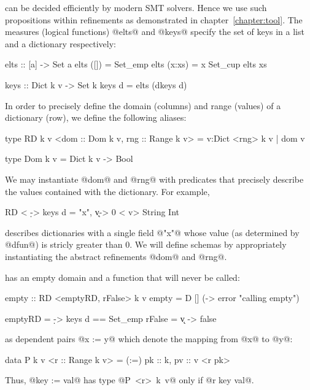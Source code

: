  can be decided
efficiently by modern SMT solvers. Hence we use such 
propositions within refinements as demonstrated in chapter~\ref{chapter:tool}.
% 
The measures (logical functions) @elts@ and @keys@ 
specify the set of keys in a list and a dictionary 
respectively:
%
\begin{code}
  elts        :: [a] -> Set a
  elts ([])   = Set_emp
  elts (x:xs) = {x} Set_cup elts xs

  keys        :: Dict k v -> Set k
  keys d      = elts (dkeys d) 
\end{code}

%
In order to precisely define the domain (\eg columns) and range (\eg values)
of a dictionary (\eg row), we define the following aliases:
%
\begin{code}
  type RD k v <dom :: Dom k v, rng :: Range k v>
    = {v:Dict <rng> k v | dom v}

  type Dom k v = Dict k v -> Bool 
\end{code}
%
We may instantiate @dom@ and @rng@ with predicates that precisely describe
the values contained with the dictionary.
%
For example,
%
\begin{code}
  RD < \d -> keys d = {"x"}, \k v-> 0 < v> String Int
\end{code}
%
%
describes dictionaries with a single field @"x"@ 
whose value (as determined by @dfun@) is stricly 
greater than 0.
%
We will define schemas by appropriately 
instantiating the abstract refinements 
@dom@ and @rng@.


 has an empty domain 
and a function that will never be called:
%
\begin{code}
  empty   :: RD <emptyRD, rFalse> k v
  empty   = D [] (\x -> error "calling empty")

  emptyRD = \d -> keys d == Set_emp
  rFalse  = \k v -> false
\end{code}
 
 as dependent pairs 
@x := y@ which denote the mapping from @x@ to @y@:
%
\begin{code}
  data P k v <r :: Range k v> 
    = (:=) {pk :: k, pv :: v <r pk>}
\end{code}
%
Thus, @key := val@ has type \hbox{@P <r> k v@} only if 
@r key val@.

